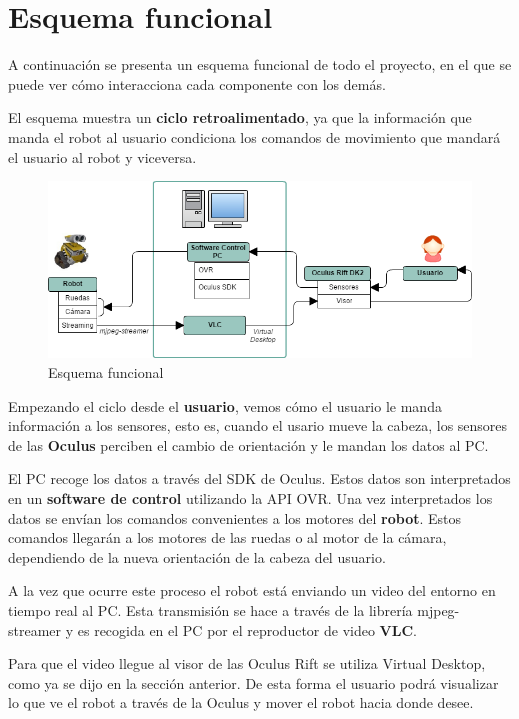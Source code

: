 \documentclass[twoside, 11pt]{epstfg}
\begin{document}
\section{Esquema funcional}
A continuación se presenta un esquema funcional de todo el proyecto, en el que se puede ver cómo interacciona cada componente con los demás.

El esquema muestra un \textbf{ciclo retroalimentado}, ya que la información que manda el robot al usuario condiciona los comandos de movimiento que mandará el usuario al robot y viceversa.

\begin{figure}[h]
	\centerline{
		\mbox{\includegraphics[width=1\textwidth]{images/EsquemaFuncional.png}}
	}
	\caption{Esquema funcional}
	\label{esquemaFuncional}
\end{figure}

Empezando el ciclo desde el \textbf{usuario}, vemos cómo el usuario le manda información a los sensores, esto es, cuando el usario mueve la cabeza, los sensores de las \textbf{Oculus} perciben el cambio de orientación y le mandan los datos al PC.

El PC recoge los datos a través del SDK de Oculus. Estos datos son interpretados en un \textbf{software de control} utilizando la API OVR. Una vez interpretados los datos se envían los comandos convenientes a los motores del \textbf{robot}. Estos comandos llegarán a los motores de las ruedas o al motor de la cámara, dependiendo de la nueva orientación de la cabeza del usuario.

A la vez que ocurre este proceso el robot está enviando un video del entorno en tiempo real al PC. Esta transmisión se hace a través de la librería mjpeg-streamer y es recogida en el PC por el reproductor de video \textbf{VLC}.

Para que el video llegue al visor de las Oculus Rift se utiliza Virtual Desktop, como ya se dijo en la sección anterior. De esta forma el usuario podrá visualizar lo que ve el robot a través de la Oculus y mover el robot hacia donde desee.
\end{document}
